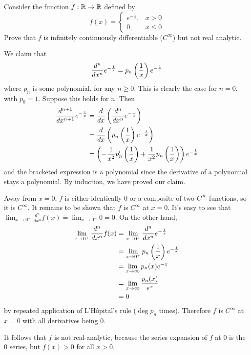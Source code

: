 \begin{problem}
Consider the function $f: \mathbb{R} \to \mathbb{R}$ defined by
$$ f(x) = \begin{cases}
    e^{-\frac{1}{x}}, & x > 0 \\
    0, & x \leq 0
\end{cases} $$
Prove that $f$ is infinitely continuously differentiable ($C^\infty$) but not real analytic.
\begin{solution}
We claim that
$$ \frac{d^n}{dx^n} e^{-\frac{1}{x}} = p_n\left( \frac{1}{x}\right) e^{-\frac{1}{x}} $$
where $p_n$ is some polynomial, for any $n \geq 0$. This is clearly the case for $n = 0$, with $p_0 = 1$. Suppose this holds for $n$. Then
\begin{align*}
    \frac{d^{n+1}}{dx^{n+1}} e^{-\frac{1}{x}} &= \frac{d}{dx} \left( \frac{d^n}{dx^n} e^{-\frac{1}{x}}\right) \\
    &= \frac{d}{dx} \left( p_n\left( \frac{1}{x}\right) e^{-\frac{1}{x}}\right) \\
    &= \left( -\frac{1}{x^2} p'_n\left( \frac{1}{x}\right) + \frac{1}{x^2} p_n\left( \frac{1}{x}\right)\right) e^{-\frac{1}{x}}
\end{align*}
and the bracketed expression is a polynomial since the derivative of a polynomial stays a polynomial. By induction, we have proved our claim.

Away from $x = 0$, $f$ is either identically 0 or a composite of two $C^\infty$ functions, so it is $C^\infty$. It remains to be shown that $f$ is $C^\infty$ at $x = 0$. It's easy to see that $\lim_{x \to 0^-} \frac{d^n}{dx^n} f(x) = \lim_{x \to 0^-} 0 = 0$. On the other hand,
\begin{align*}
    \lim_{x \to 0^+} \frac{d^n}{dx^n} f(x) &= \lim_{x \to 0^+} \frac{d^n}{dx^n} e^{-\frac{1}{x}} \\
    &= \lim_{x \to 0^+} p_n\left( \frac{1}{x}\right) e^{-\frac{1}{x}} \\
    &= \lim_{x \to \infty} p_n(x) e^{-x} \\
    &= \lim_{x \to \infty} \frac{p_n(x)}{e^x} \\
    &= 0
\end{align*}
by repeated application of L'Hôpital's rule ($\deg p_n$ times). Therefore $f$ is $C^\infty$ at $x = 0$ with all derivatives being $0$.

It follows that $f$ is not real-analytic, because the series expansion of $f$ at 0 is the 0 series, but $f(x) > 0$ for all $x > 0$.
\end{solution}
\end{problem}
